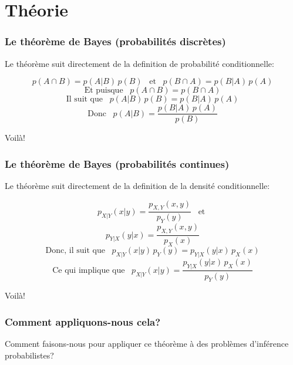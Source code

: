 \documentclass{beamer}
\begin{document}




\section{Théorie}


\begin{frame}
    \frametitle{Le théorème de Bayes (probabilités discrètes)}
    Le théorème suit directement de la definition de probabilité conditionnelle:

    \[p(A \cap B) =  p(A | B) \, p(B) \,\,\, \textrm{ et } \,\,\, p(B \cap A) =  p(B | A) \, p(A)\]
    \[\textrm{Et puisque } \,\,\, p(A \cap B) = p(B \cap A)\]
    \[\textrm{Il suit que } \,\,\, p(A | B) \, p(B) = p(B | A) \, p(A)\]
    \[\textrm{Donc } \,\,\, p(A | B) = \frac{p(B | A) \, p(A)}{p(B)}\]
    
    Voilà!
\end{frame}


\begin{frame}
    \frametitle{Le théorème de Bayes (probabilités continues)}
    Le théorème suit directement de la definition de la densité conditionnelle:

    \[p_{X|Y}(x|y) = \frac{p_{X,Y}(x,y)}{p_Y(y)} \,\,\, \textrm{ et }\]
    \[p_{Y|X}(y|x) = \frac{p_{X,Y}(x,y)}{p_X(x)}\]
    \[\textrm{Donc, il suit que } \,\,\, p_{X|Y}(x|y) \, p_Y(y) = p_{Y|X}(y|x) \, p_X(x)\]
    \[\textrm{Ce qui implique que } \,\,\, p_{X|Y}(x|y) = \frac{p_{Y|X}(y|x) \, p_X(x)}{p_Y(y)}\]

    Voilà!
\end{frame}


\begin{frame}
    \frametitle{Comment appliquons-nous cela?}
    Comment faisons-nous pour appliquer ce théorème à des problèmes 
    d'inférence probabilistes?

    \vfill

\end{frame}
\end{document}
